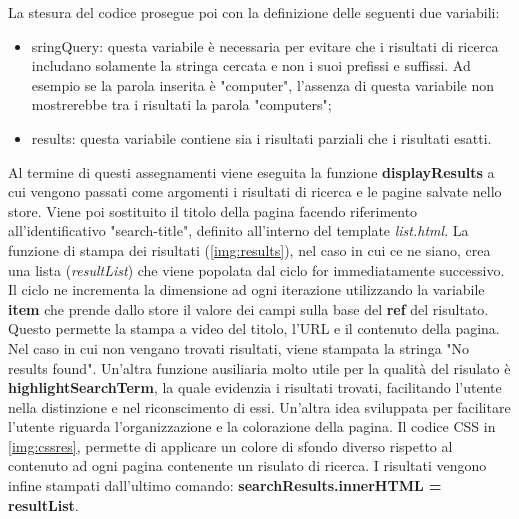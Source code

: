 \documentclass[target=bach,aauheader=]{thud}
\begin{document}
\begin{enumerate}
    \newline \newline
    La stesura del codice prosegue poi con la definizione delle seguenti due variabili:
    \begin{itemize}
        \item sringQuery: questa variabile è necessaria per evitare che i risultati di ricerca includano solamente la stringa cercata e non i suoi prefissi e suffissi. Ad esempio se la parola inserita è "computer", l'assenza di questa variabile non mostrerebbe tra i risultati la parola "computers";
        \item results: questa variabile contiene sia i risultati parziali che i risultati esatti.
    \end{itemize}
    Al termine di questi assegnamenti viene eseguita la funzione \textbf{displayResults} a cui vengono passati come argomenti i risultati di ricerca e le pagine salvate nello store. Viene poi sostituito il titolo della pagina facendo riferimento all'identificativo "search-title", definito all'interno del template \textit{list.html}. 
    \newline \newline
    La funzione di stampa dei risultati (\cref{img:results}), nel caso in cui ce ne siano, crea una lista (\textit{resultList}) che viene popolata dal ciclo for immediatamente successivo. Il ciclo ne incrementa la dimensione ad ogni iterazione utilizzando la variabile \textbf{item} che prende dallo store il valore dei campi sulla base del \textbf{ref} del risultato. 
    Questo permette la stampa a video del titolo, l'URL e il contenuto della pagina. Nel caso in cui non vengano trovati risultati, viene stampata la stringa "No results found".
    \newline \newline
    Un'altra funzione ausiliaria molto utile per la qualità del risulato è \textbf{highlightSearchTerm}, la quale evidenzia i risultati trovati, facilitando l'utente nella distinzione e nel riconscimento di essi. 
    \newline
    Un'altra idea sviluppata per facilitare l'utente riguarda l'organizzazione e la colorazione della pagina. Il codice CSS in \cref{img:cssres}, permette di applicare un colore di sfondo diverso rispetto al contenuto ad ogni pagina contenente un risulato di ricerca. 
    \newline \newline
    I risultati vengono infine stampati dall'ultimo comando: \textbf{searchResults.innerHTML = resultList}.

\end{enumerate}
\end{document}
